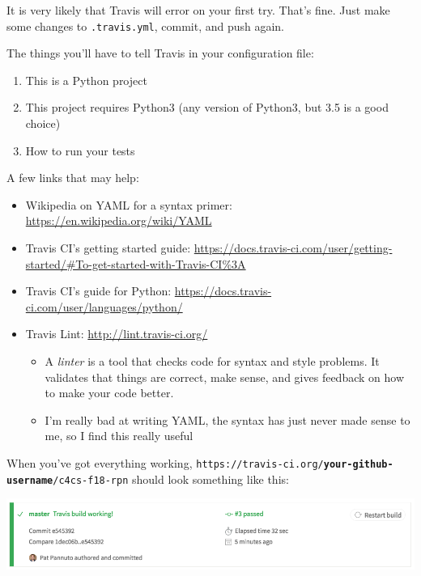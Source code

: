 \documentclass{article}
\begin{document}
It is very likely that Travis will error on your first try. That's fine. Just
make some changes to \texttt{.travis.yml}, commit, and push again.

The things you'll have to tell Travis in your configuration file:
\begin{enumerate}
  \item This is a Python project
  \item This project requires Python3 (any version of Python3, but 3.5 is a
    good choice)
  \item How to run your tests
\end{enumerate}

A few links that may help:
\begin{itemize}
  \item Wikipedia on YAML for a syntax primer: \url{https://en.wikipedia.org/wiki/YAML}
  \item Travis CI's getting started guide:
    \url{https://docs.travis-ci.com/user/getting-started/#To-get-started-with-Travis-CI\%3A}
  \item Travis CI's guide for Python:
    \url{https://docs.travis-ci.com/user/languages/python/}
  \item Travis Lint: \url{http://lint.travis-ci.org/}
    \begin{itemize}
      \item A \emph{linter} is a tool that checks code for syntax and style
        problems. It validates that things are correct, make sense, and gives
        feedback on how to make your code better.
      \item I'm really bad at writing YAML, the syntax has just never made
        sense to me, so I find this really useful
    \end{itemize}
\end{itemize}

When you've got everything working,
\texttt{https://travis-ci.org/\textbf{your-github-username}/c4cs-f18-rpn}
should look something like this:

\includegraphics[width=\linewidth]{travis-rpn-working}


\vfill
\end{document}
